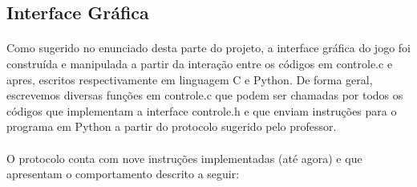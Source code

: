 \documentclass[a4paper]{article}
\begin{document}
 \subsection{Interface Gráfica}
 \paragraph{}
 Como sugerido no enunciado desta parte do projeto, a interface gráfica do jogo foi construída e manipulada a partir da interação entre os códigos em controle.c  e apres, escritos respectivamente em linguagem C e Python. De forma geral, escrevemos diversas funções em controle.c que podem ser chamadas por todos os códigos que implementam a interface controle.h e que enviam instruções para o programa em Python a partir do protocolo sugerido pelo professor.
 \paragraph{}
 O protocolo conta com nove instruções implementadas (até agora) e que apresentam o comportamento descrito a seguir:
 
\end{document}
